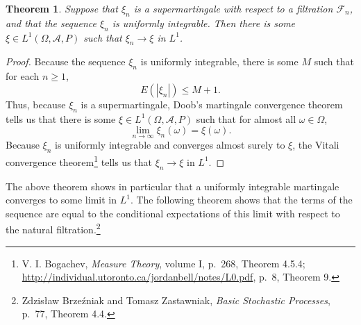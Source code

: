 \documentclass{article}
\newtheorem{theorem}{Theorem}
\theoremstyle{definition}
\begin{document}
\begin{theorem}
Suppose that $\xi_n$ is a supermartingale with respect to a filtration $\mathscr{F}_n$, and that the sequence $\xi_n$ is uniformly
integrable. Then there is some $\xi \in L^1(\Omega,\mathscr{A},P)$ such that
$\xi_n \to \xi$ in $L^1$.
\label{uniform}
\end{theorem}
\begin{proof}
Because the sequence $\xi_n$ is uniformly integrable, there is some $M$ such that for each $n \geq 1$,
\[
E(|\xi_n|) \leq M+1.
\]
Thus, because $\xi_n$ is a supermartingale, Doob's martingale convergence theorem tells us that there is some
$\xi \in L^1(\Omega,\mathscr{A},P)$ such that for almost all $\omega \in \Omega$,
\[
\lim_{n \to \infty} \xi_n(\omega) = \xi(\omega).
\]
Because $\xi_n$ is uniformly integrable and converges almost surely to $\xi$, the Vitali convergence theorem\footnote{
V. I. Bogachev, {\em Measure Theory}, volume I, p.~268, Theorem 4.5.4;
\url{http://individual.utoronto.ca/jordanbell/notes/L0.pdf},
p.~8, Theorem 9.} tells us that $\xi_n \to \xi$ in $L^1$.
\end{proof}


The above theorem shows in particular that a uniformly integrable martingale converges to some limit in $L^1$. The following theorem shows
that the terms of the sequence are equal to the conditional expectations of this limit with respect to the natural filtration.\footnote{Zdzis\l{}aw Brze\'zniak and Tomasz Zastawniak, {\em Basic Stochastic Processes},
p.~77, Theorem 4.4.}
\end{document}
